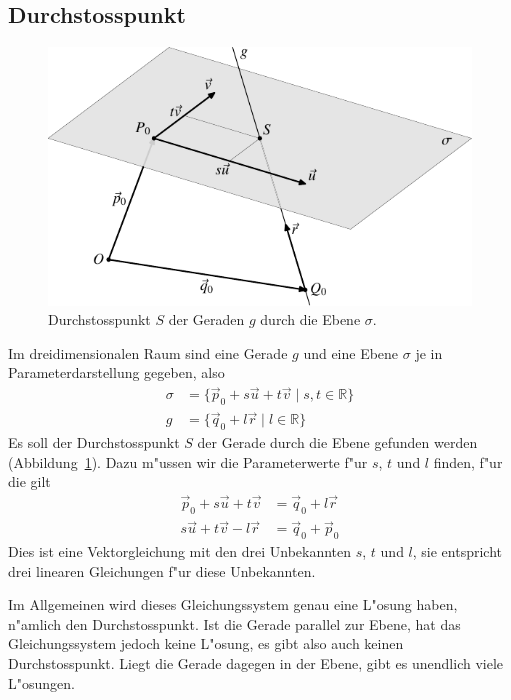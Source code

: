 \subsection{Durchstosspunkt\label{subsection-durchstosspunkt}}
\begin{figure}
\begin{center}
\includegraphics{images/v-9}
\end{center}
\caption{Durchstosspunkt $S$ der Geraden $g$ durch die Ebene
$\sigma$.\label{image-durchstosspunkt}}
\end{figure}
Im dreidimensionalen Raum
sind eine Gerade $g$ und eine Ebene $\sigma$ je in Parameterdarstellung gegeben, also
\begin{align*}
\sigma&=
\{
\vec p_0+s\vec u+t\vec v\;
|\;s, t\in\mathbb R\}
\\
g&=
\{
\vec q_0+l\vec r\;
|\;l\in\mathbb R
\}
\end{align*}
Es soll der Durchstosspunkt $S$ der Gerade durch die Ebene gefunden
werden (Abbildung~\ref{image-durchstosspunkt}).
Dazu m"ussen wir die Parameterwerte f"ur $s$, $t$ und $l$ finden,
f"ur die gilt
\begin{align*}
\vec p_0+s\vec u+t\vec v
&=
\vec q_0+l\vec r
\\
s\vec u+t\vec v-l\vec r&=\vec q_0+\vec p_0
\end{align*}
Dies ist eine Vektorgleichung mit den drei Unbekannten $s$, $t$ und $l$,
sie entspricht drei linearen Gleichungen f"ur diese Unbekannten.

Im Allgemeinen wird dieses Gleichungssystem genau eine L"osung haben,
n"amlich den Durchstosspunkt.
Ist die Gerade parallel zur Ebene, hat das Gleichungssystem jedoch keine
L"osung, es gibt also auch keinen Durchstosspunkt. Liegt die Gerade
dagegen in der Ebene, gibt es unendlich viele L"osungen.

